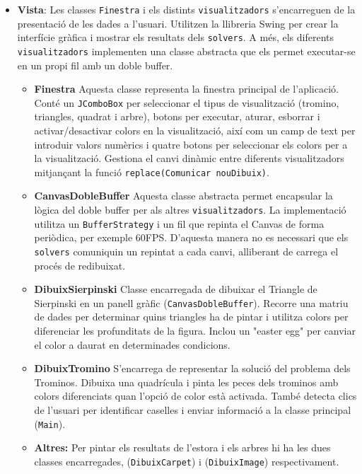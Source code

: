 \documentclass{ieeetj}
\begin{document}
\begin{itemize}
    \item \textbf{Vista}:
    Les classes \texttt{Finestra} i els distints \texttt{visualitzadors} s'encarreguen de la presentació de les dades a l'usuari. Utilitzen la llibreria Swing per crear la interfície gràfica i mostrar els resultats dels \texttt{solvers}.
    A més, els diferents \texttt{visualitzadors} implementen una classe abstracta que els permet executar-se en un propi fil amb un doble buffer.
\begin{itemize}
 \item\textbf{Finestra}
Aquesta classe representa la finestra principal de l'aplicació. Conté un \texttt{JComboBox} per seleccionar el tipus de visualització (tromino, triangles, quadrat i arbre), botons per executar, aturar, esborrar i activar/desactivar colors en la visualització, així com un camp de text per introduir valors numèrics i quatre botons per seleccionar els colors per a la visualització. Gestiona el canvi dinàmic entre diferents visualitzadors mitjançant la funció \texttt{replace(Comunicar nouDibuix)}.

\item \textbf{CanvasDobleBuffer}
Aquesta classe abstracta permet encapsular la lògica del doble buffer per als altres \texttt{visualitzadors}. La implementació utilitza un \texttt{BufferStrategy} i un fil que repinta el Canvas de forma periòdica, per exemple 60FPS. D'aquesta manera no es necessari que els \texttt{solvers} comuniquin un repintat a cada canvi, alliberant de carrega el procés de redibuixat.

\item\textbf{DibuixSierpinski}
Classe encarregada de dibuixar el Triangle de Sierpinski en un panell gràfic (\texttt{CanvasDobleBuffer}). Recorre una matriu de dades per determinar quins triangles ha de pintar i utilitza colors per diferenciar les profunditats de la figura. Inclou un "easter egg" per canviar el color a daurat en determinades condicions. \cite{easter_egg}
\item\textbf{DibuixTromino}
S'encarrega de representar la solució del problema dels Trominos. Dibuixa una quadrícula i pinta les peces dels trominos amb colors diferenciats quan l'opció de color està activada. També detecta clics de l'usuari per identificar caselles i enviar informació a la classe principal (\texttt{Main}).

\item \textbf{Altres:} Per pintar els resultats de l'estora i els arbres hi ha les dues classes encarregades, (\texttt{DibuixCarpet}) i (\texttt{DibuixImage}) respectivament.
\end{itemize}


\end{itemize}
\end{document}

